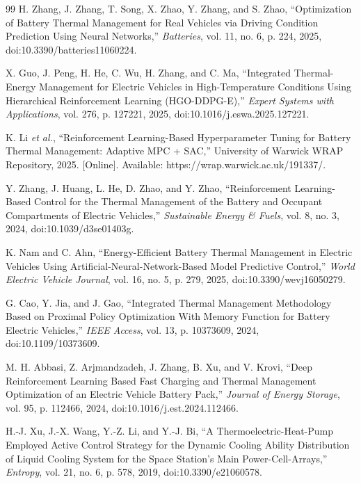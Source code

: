 \documentclass{article}
\begin{document}
\begin{thebibliography}{99}
H. Zhang, J. Zhang, T. Song, X. Zhao, Y. Zhang, and S. Zhao, ``Optimization of Battery Thermal Management for Real Vehicles via Driving Condition Prediction Using Neural Networks,'' \textit{Batteries}, vol. 11, no. 6, p. 224, 2025, doi:10.3390/batteries11060224.

X. Guo, J. Peng, H. He, C. Wu, H. Zhang, and C. Ma, ``Integrated Thermal-Energy Management for Electric Vehicles in High-Temperature Conditions Using Hierarchical Reinforcement Learning (HGO-DDPG-E),'' \textit{Expert Systems with Applications}, vol. 276, p. 127221, 2025, doi:10.1016/j.eswa.2025.127221.

K. Li \textit{et al.}, ``Reinforcement Learning-Based Hyperparameter Tuning for Battery Thermal Management: Adaptive MPC + SAC,'' University of Warwick WRAP Repository, 2025. [Online]. Available: https://wrap.warwick.ac.uk/191337/.

Y. Zhang, J. Huang, L. He, D. Zhao, and Y. Zhao, ``Reinforcement Learning-Based Control for the Thermal Management of the Battery and Occupant Compartments of Electric Vehicles,'' \textit{Sustainable Energy \& Fuels}, vol. 8, no. 3, 2024, doi:10.1039/d3se01403g.

K. Nam and C. Ahn, ``Energy-Efficient Battery Thermal Management in Electric Vehicles Using Artificial-Neural-Network-Based Model Predictive Control,'' \textit{World Electric Vehicle Journal}, vol. 16, no. 5, p. 279, 2025, doi:10.3390/wevj16050279.

G. Cao, Y. Jia, and J. Gao, ``Integrated Thermal Management Methodology Based on Proximal Policy Optimization With Memory Function for Battery Electric Vehicles,'' \textit{IEEE Access}, vol. 13, p. 10373609, 2024, doi:10.1109/10373609.

M. H. Abbasi, Z. Arjmandzadeh, J. Zhang, B. Xu, and V. Krovi, ``Deep Reinforcement Learning Based Fast Charging and Thermal Management Optimization of an Electric Vehicle Battery Pack,'' \textit{Journal of Energy Storage}, vol. 95, p. 112466, 2024, doi:10.1016/j.est.2024.112466.

H.-J. Xu, J.-X. Wang, Y.-Z. Li, and Y.-J. Bi, ``A Thermoelectric-Heat-Pump Employed Active Control Strategy for the Dynamic Cooling Ability Distribution of Liquid Cooling System for the Space Station's Main Power-Cell-Arrays,'' \textit{Entropy}, vol. 21, no. 6, p. 578, 2019, doi:10.3390/e21060578.


\end{thebibliography}
\end{document}

